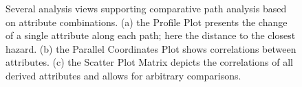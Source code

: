 \documentclass[conference,10pt,letter]{IEEEtran}
\begin{document}
\begin{figure}
	\centering
	\hfill
	\hfill
	\caption{Several analysis views supporting comparative path analysis based on attribute combinations. (a) the Profile Plot presents the change of a single attribute along each path; here the distance to the closest hazard. (b) the Parallel Coordinates Plot shows correlations between attributes. (c) the Scatter Plot Matrix depicts the correlations of all derived attributes and allows for arbitrary comparisons.}
\end{figure}
\end{document}
